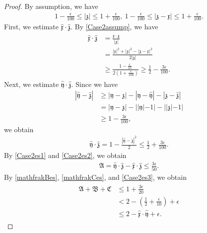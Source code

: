 \documentclass[reqno]{amsart}
\theoremstyle{plain}
\theoremstyle{definition}
\numberwithin{equation}{section}
\begin{document}
\begin{proof}
By assumption, we have
\begin{align}\label{Case2assump}
1-\frac{\epsilon}{100}\leq |\mathfrak{z}|\leq 1+\frac{\epsilon}{100},\ 1-\frac{\epsilon}{100}\leq |\mathfrak{z}-\mathfrak{x}|\leq 1+\frac{\epsilon}{100}.
\end{align}
First, we estimate $\hat{\mathfrak{x}}\cdot \hat{\mathfrak{z}}$. By \eqref{Case2assump}, we have
\begin{align}\label{Case2es1}
\begin{aligned}
\hat{\mathfrak{x}}\cdot \hat{\mathfrak{z}}&=\frac{ \mathfrak{x}\cdot \mathfrak{z}}{|\mathfrak{z}|}
\\
&=\frac{|\mathfrak{x}|^2+|\mathfrak{z}|^2-|\mathfrak{z}-\mathfrak{x}|^2}{2|\mathfrak{z}|}
\\
&\geq \frac{1-\frac{\epsilon}{25}}{2(1+\frac{\epsilon}{100})}\geq \frac{1}{2}-\frac{3\epsilon}{100}.
\end{aligned}
\end{align}
Next, we estimate $\hat{\mathfrak{y}}\cdot \hat{\mathfrak{z}}$. Since we have
\begin{align*}
|\hat{\mathfrak{y}}-\hat{\mathfrak{z}}|&\geq |\mathfrak{y}-\mathfrak{z}|-|\mathfrak{y}-\hat{\mathfrak{y}}|-|\mathfrak{z}-\hat{\mathfrak{z}}|
\\
&=|\mathfrak{y}-\mathfrak{z}|-||\mathfrak{y}|-1|-||\mathfrak{z}|-1|
\\
&\geq 1-\frac{3\epsilon}{100},
\end{align*}
we obtain 
\begin{align}\label{Case2es2}
\hat{\mathfrak{y}}\cdot \hat{\mathfrak{z}}=1-\frac{|\hat{\mathfrak{y}}-\hat{\mathfrak{z}}|^2}{2}\leq \frac{1}{2}+\frac{3\epsilon}{100}.
\end{align}
By \eqref{Case2es1} and \eqref{Case2es2}, we obtain
\begin{align}\label{Case2es3}
\mathfrak{A}=\hat{\mathfrak{y}}\cdot \hat{\mathfrak{z}}-\hat{\mathfrak{x}}\cdot \hat{\mathfrak{z}}\leq \frac{3\epsilon}{50}.
\end{align}
By \eqref{mathfrakBes}, \eqref{mathfrakCes}, and \eqref{Case2es3}, we obtain
\begin{align}\label{mathfrakCase2}
\begin{aligned}
\mathfrak{A}+\mathfrak{B}+\mathfrak{C}&\leq 1+\frac{3\epsilon}{20}
\\
&< 2-\left(\frac{1}{2}+\frac{\epsilon}{10}\right)+\epsilon
\\
&\leq 2-\hat{\mathfrak{x}}\cdot \hat{\mathfrak{y}}+\epsilon.
\end{aligned}
\end{align}


\end{proof}
\end{document}

